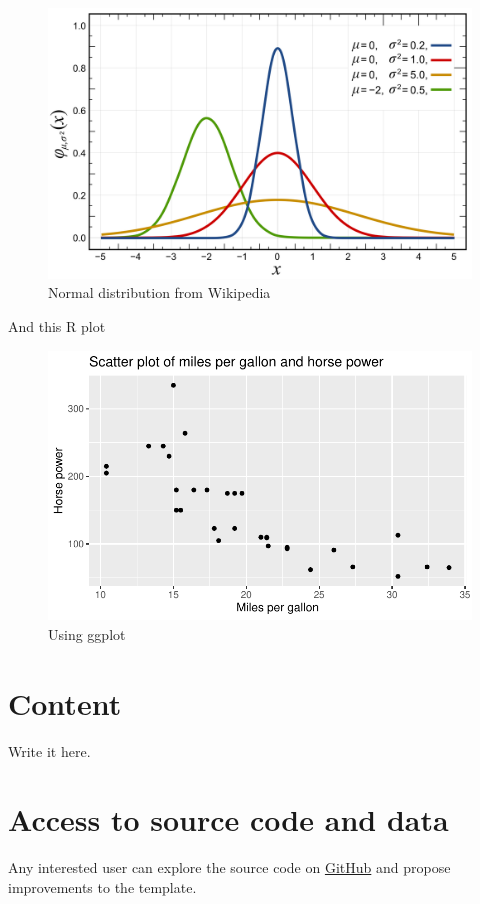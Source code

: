 \documentclass{latex/CUP-JNL-DAP}%
\begin{document}
\begin{figure}[H]

{\centering \includegraphics[width=0.5\linewidth,height=\textheight,keepaspectratio]{images/Normal_Distribution_PDF.png}

}

\caption{Normal distribution from Wikipedia}

\end{figure}%

And this R plot

\begin{figure}[H]

{\centering \includegraphics[width=0.5\linewidth,height=\textheight,keepaspectratio]{paper_files/figure-pdf/intro3-1.pdf}

}

\caption{Using ggplot}

\end{figure}%

\section{Content}\label{content}

Write it here.

\section{Access to source code and
data}\label{access-to-source-code-and-data}

Any interested user can explore the source code on
\href{https://github.com/pachadotdev/data-and-policy-quarto-template}{GitHub}
and propose improvements to the template.
\end{document}
